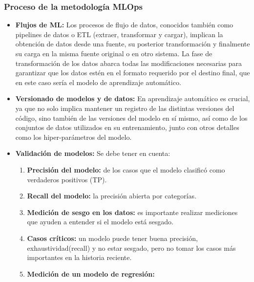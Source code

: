 \subsubsection{Proceso de la metodología MLOps}
\begin{itemize}
\item \textbf{Flujos de ML:} Los procesos de flujo de datos, conocidos también como pipelines de datos o ETL (extraer, transformar y cargar), implican la obtención de datos desde una fuente, su posterior transformación y finalmente su carga en la misma fuente original o en otro sistema. La fase de transformación de los datos abarca todas las modificaciones necesarias para garantizar que los datos estén en el formato requerido por el destino final, que en este caso sería el modelo de aprendizaje automático.
\item \textbf{Versionado de modelos y de datos:} En aprendizaje automático es crucial, ya que no solo implica mantener un registro de las distintas versiones del código, sino también de las versiones del modelo en sí mismo, así como de los conjuntos de datos utilizados en su entrenamiento, junto con otros detalles como los hiper-parámetros del modelo.
\item \textbf{Validación de modelos:} Se debe tener en cuenta:
    \begin{enumerate}
        \item \textbf{Precisión del modelo:} de los casos que el modelo clasificó como verdaderos positivos (TP).
        \item \textbf{Recall del modelo:} la precisión abierta por categorías.
        \item \textbf{Medición de sesgo en los datos:} es importante realizar mediciones que ayuden a entender si el modelo está sesgado.
        \item \textbf{Casos críticos:} un modelo puede tener buena precisión, exhaustividad(recall) y no estar sesgado, pero no tomar los casos más importantes en la historia reciente.
        \item \textbf{Medición de un modelo de regresión:}\\


\end{enumerate}
\end{itemize}
